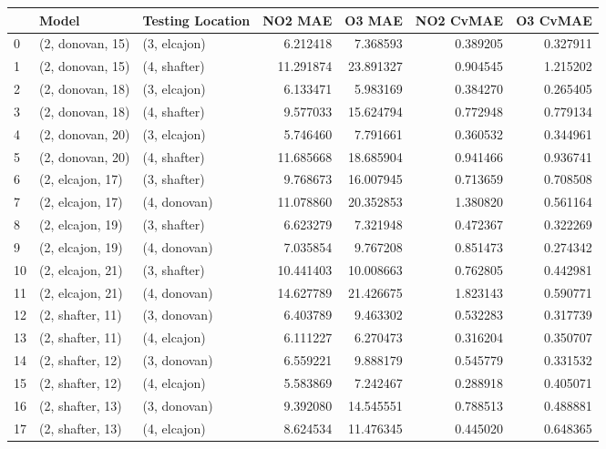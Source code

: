 \begin{tabular}{lllrrrr}
\toprule
{} &             Model & Testing Location &    NO2 MAE &     O3 MAE &  NO2 CvMAE &  O3 CvMAE \\
\midrule
0  &  (2, donovan, 15) &     (3, elcajon) &   6.212418 &   7.368593 &   0.389205 &  0.327911 \\
1  &  (2, donovan, 15) &     (4, shafter) &  11.291874 &  23.891327 &   0.904545 &  1.215202 \\
2  &  (2, donovan, 18) &     (3, elcajon) &   6.133471 &   5.983169 &   0.384270 &  0.265405 \\
3  &  (2, donovan, 18) &     (4, shafter) &   9.577033 &  15.624794 &   0.772948 &  0.779134 \\
4  &  (2, donovan, 20) &     (3, elcajon) &   5.746460 &   7.791661 &   0.360532 &  0.344961 \\
5  &  (2, donovan, 20) &     (4, shafter) &  11.685668 &  18.685904 &   0.941466 &  0.936741 \\
6  &  (2, elcajon, 17) &     (3, shafter) &   9.768673 &  16.007945 &   0.713659 &  0.708508 \\
7  &  (2, elcajon, 17) &     (4, donovan) &  11.078860 &  20.352853 &   1.380820 &  0.561164 \\
8  &  (2, elcajon, 19) &     (3, shafter) &   6.623279 &   7.321948 &   0.472367 &  0.322269 \\
9  &  (2, elcajon, 19) &     (4, donovan) &   7.035854 &   9.767208 &   0.851473 &  0.274342 \\
10 &  (2, elcajon, 21) &     (3, shafter) &  10.441403 &  10.008663 &   0.762805 &  0.442981 \\
11 &  (2, elcajon, 21) &     (4, donovan) &  14.627789 &  21.426675 &   1.823143 &  0.590771 \\
12 &  (2, shafter, 11) &     (3, donovan) &   6.403789 &   9.463302 &   0.532283 &  0.317739 \\
13 &  (2, shafter, 11) &     (4, elcajon) &   6.111227 &   6.270473 &   0.316204 &  0.350707 \\
14 &  (2, shafter, 12) &     (3, donovan) &   6.559221 &   9.888179 &   0.545779 &  0.331532 \\
15 &  (2, shafter, 12) &     (4, elcajon) &   5.583869 &   7.242467 &   0.288918 &  0.405071 \\
16 &  (2, shafter, 13) &     (3, donovan) &   9.392080 &  14.545551 &   0.788513 &  0.488881 \\
17 &  (2, shafter, 13) &     (4, elcajon) &   8.624534 &  11.476345 &   0.445020 &  0.648365 \\

\end{tabular}
